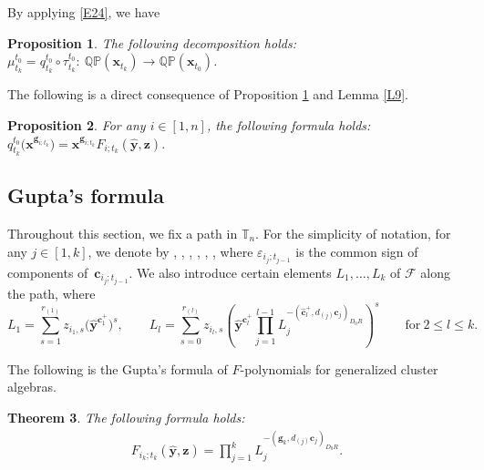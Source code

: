 \documentclass[10pt,a4paper]{amsart}
\numberwithin{equation}{section}
\newtheorem{Theorem}{Theorem}[section]
\newtheorem{Proposition}[Theorem]{Proposition}
 { \theoremstyle{definition}
\newtheorem{Definition}[Theorem]{Definition}
\newtheorem{Note}[Theorem]{Note}
\newtheorem{Example}[Theorem]{Example}
\newtheorem{Remark}[Theorem]{Remark} }
\begin{document}
By applying \eqref{E24}, we have
\begin{Proposition}\label{P11}
 The following decomposition holds:
$
\mu_{t_k}^{t_0}=q_{t_k}^{t_0}\circ\tau_{t_k}^{t_0}\colon\  \mathbb{QP}(\mathbf{x}_{t_k})\longrightarrow\mathbb{QP}(\mathbf{x}_{t_0})$.
\end{Proposition}

The following is a direct consequence of Proposition \ref{P11} and Lemma \ref{L9}.
\begin{Proposition}\label{p:FG-decomp}
 For any $i\in [1,n]$, the following formula holds:
$
 q_{t_k}^{t_0}\bigl(\mathbf{x}^{\mathbf{g}_{i;t_k}}\bigr)=\mathbf{x}^{\mathbf{g}_{i;t_k}}F_{i;t_k}(\hat{\mathbf{y}},\mathbf{z})$.
\end{Proposition}

\subsection{Gupta's formula}\label{S5}
Throughout this section, we fix a path
 in $\mathbb{T}_n$. For the simplicity of notation, for any $j\in [1,k]$, we denote by , , , , , , where $\varepsilon_{i_j;t_{j-1}}$ is the common sign of components of~$\mathbf{c}_{i_j;t_{j-1}}$.
We also introduce certain elements $L_1,\dots, L_k$ of $\mathcal{F}$ along the path, where
\[
L_1=\sum_{s=1}^{r_{(1)}}\!z_{i_1,s}\bigl(\hat{\mathbf{y}}^{\mathbf{c}_{1}^+}\bigr)^s, \qquad
L_l=\sum\limits_{s=0}^{r_{(l)}}z_{i_l,s}\left(\hat{\mathbf{y}}^{\mathbf{c}_{l}^+} \prod\limits_{j=1}^{l-1}L_j^{-(\mathbf{\hat{c}}_{l}^+,d_{(j)}\mathbf{c}_{j})_{D_0R}}\right)^s\qquad \text{for}\  2\leq l\leq k.
\]


The following is the Gupta's formula of $F$-polynomials for generalized cluster algebras.

\begin{Theorem}\label{T5}
The following formula holds:
 \begin{align}
 F_{i_k;t_k}(\hat{\mathbf{y}},\mathbf{z})=\prod\limits_{j=1}^{k}L_{j}^{-(\mathbf{g}_{k},d_{(j)}\mathbf{c}_{j})_{D_0R}}.\label{E34}
 \end{align}
\end{Theorem}
\end{document}
